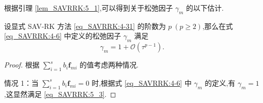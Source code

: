 根据引理 \ref{lem_SAVRRK:5_1},可以得到关于松弛因子 $\gamma_m$ 的以下估计.

\begin{theorem}\label{thm_SAVRRK:5_1}
设显式 SAV-RK 方法 \eqref{eq_SAVRRK:4-31} 的阶数为 $p~(p \geq 2)$,那么在式 \eqref{eq_SAVRRK:4-6} 中定义的松弛因子 $\gamma_m$ 满足
\begin{equation}\label{eq_SAVRRK:5_3}
\gamma_m=1+\mathcal{O}(\tau^{p-1}).
\end{equation}
\end{theorem}	

\begin{proof}
根据 $\sum\limits_{i=1}^s b_i \bm{f}_{m i}$ 的值考虑两种情况.

情况 1：当 $\sum\limits_{i=1}^s b_i \bm{f}_{m i} = 0$ 时,根据式 \eqref{eq_SAVRRK:4-6} 中 $\gamma_m$ 的定义,有 $\gamma_m = 1$,这显然满足 \eqref{eq_SAVRRK:5_3}.


\end{proof}

